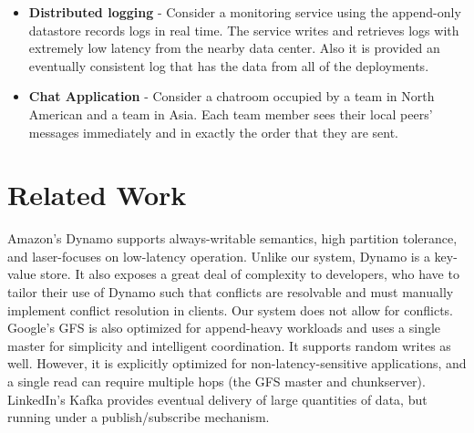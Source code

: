 \documentclass[11pt,english,twocolumn]{article}
\begin{document}
\begin{itemize}
	\item \textbf{Distributed logging} - Consider a monitoring service using the append-only datastore records logs in real time. The service writes and retrieves logs with extremely low latency from the nearby data center. Also it is provided an eventually consistent log that has the data from all of the deployments.
	\item \textbf{Chat Application} - Consider a chatroom
		occupied by a team in North American and a team in Asia. Each
		team member sees their local peers' messages immediately and in
		exactly the order that they are sent.
\end{itemize}

\section{Related Work}
Amazon's Dynamo \cite{Dynamo} supports always-writable semantics, high partition
tolerance, and laser-focuses on low-latency operation. Unlike our system, Dynamo
is a key-value store. It also exposes a great deal of complexity to developers,
who have to tailor their use of Dynamo such that conflicts are resolvable and
must manually implement conflict resolution in clients. Our system does not
allow for conflicts. Google's GFS \cite{GFS} is also optimized for append-heavy workloads and uses a
single master for simplicity and intelligent coordination. It supports random
writes as well. However, it is explicitly optimized for non-latency-sensitive
applications, and a single read can require multiple hops (the GFS master and
chunkserver). LinkedIn's Kafka \cite{Kafka} provides eventual delivery of large
quantities of data, but running under a publish/subscribe
mechanism.

\vspace{-0.4cm}
\end{document}
